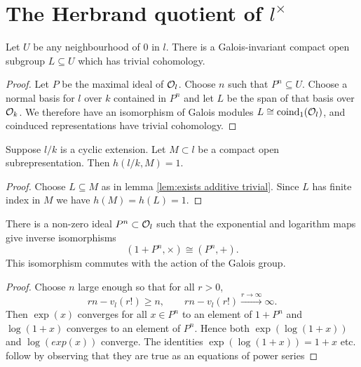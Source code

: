 \section{The Herbrand quotient of $l^\times$}

\begin{lemma}
	\label{lem:exists additive trivial}
	Let $U$ be any neighbourhood of $0$ in $l$.
	There is a Galois-invariant compact open subgroup $L \subseteq U$
	which has trivial cohomology.
\end{lemma}

\begin{proof}
	Let $P$ be the maximal ideal of ${\mathcal O}_l$.
	Choose $n$ such that $P^n \subseteq U$.
	Choose a normal basis for $l$ over $k$ contained in $P^n$
	and let $L$ be the span of that basis over ${\mathcal O}_k$.
	We therefore have an isomorphism of Galois modules $L \cong \mathrm{coind}_1({\mathcal O}_l)$, and coinduced
	representations have trivial cohomology.
\end{proof}

\begin{lemma} \label{lem:herbrand compact open additive}
	Suppose $l/k$ is a cyclic extension.
	Let $M \subset l$ be a compact open subrepresentation.
	Then $h(l/k,M)=1$.
\end{lemma}

\begin{proof}
	Choose $L \subseteq M$ as in lemma \ref{lem:exists additive trivial}.
	Since $L$ has finite index in $M$ we have $h(M) = h(L) = 1$.
\end{proof}


\begin{lemma}\label{lem:local isomorphism}
	There is a non-zero ideal $P^n \subset {\mathcal O}_l$ such that the
	exponential and logarithm maps give inverse isomorphisms
	\[
		(1 + P^n, \times) \cong (P^n,+).
	\]
	This isomorphism commutes with the action of the Galois group.
\end{lemma}

\begin{proof}
	Choose $n$ large enough so that for all $r > 0$,
	\[
		rn - v_l(r!) \ge n, \qquad
		rn - v_l(r!) \stackrel{r \to \infty}\to \infty.
	\]
	Then $\exp(x)$ converges for all $x \in P^n$ to an element of $1 + P^n$ and
	$\log(1+x)$ converges to an element of $P^n$.
	Hence both $\exp(\log(1+x))$ and $\log(exp(x))$ converge.
	The identities $\exp(\log(1+x))=1+x$ etc. follow by observing that they are true as
	an equations of power series
\end{proof}


